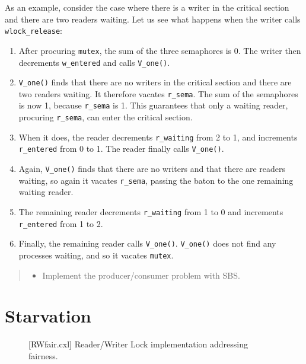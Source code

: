 \documentclass{report}
\newenvironment{code}{
\tcolorbox
}{
\endtcolorbox
}
\begin{document}
As an example, consider the case where there is a writer in the critical
section and there are two readers waiting.  Let us see what happens when
the writer calls \texttt{wlock\_release}:
\begin{enumerate}
\item After procuring \texttt{mutex},
the sum of the three semaphores is 0.  The writer then decrements
\texttt{w\_entered} and calls \texttt{V\_one()}.
\item \texttt{V\_one()} finds that there are no writers in the critical section
and there are two readers waiting.  It therefore vacates \texttt{r\_sema}.
The sum of the semaphores is now 1, because \texttt{r\_sema} is 1.  This
guarantees that only a waiting reader, procuring \texttt{r\_sema}, can enter
the critical section.
\item When it does, the reader decrements \texttt{r\_waiting}
from 2 to 1, and increments \texttt{r\_entered} from 0 to 1.
The reader finally calls \texttt{V\_one()}.
\item Again, \texttt{V\_one()} finds that there are no writers and
that there are readers waiting, so again it vacates \texttt{r\_sema},
passing the baton to the one remaining waiting reader.
\item The remaining reader decrements \texttt{r\_waiting} from 1 to 0 and
increments \texttt{r\_entered} from 1 to 2.
\item Finally, the remaining reader  calls \texttt{V\_one()}.
\texttt{V\_one()} does not find any processes waiting,
and so it vacates \texttt{mutex}.
\end{enumerate}

\begin{quote}
\begin{itemize}
\item Implement the producer/consumer problem with SBS.
\end{itemize}
\end{quote}

\chapter{Starvation}
\label{ch:starvation}

\begin{figure}
\begin{code}
\end{code}
\caption{[RWfair.cxl] Reader/Writer Lock implementation addressing fairness.}
\label{fig:RWfair}
\end{figure}
\end{document}
